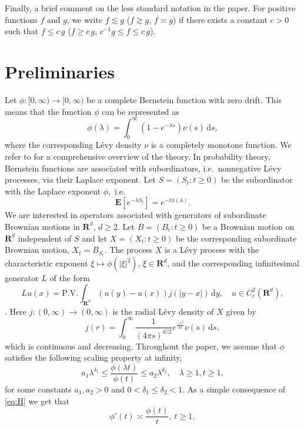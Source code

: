 \documentclass[a4paper,12pt,draft]{article}
\theoremstyle{plain}
\theoremstyle{definition}
\numberwithin{equation}{section}
\newcommand\R{\mathbf{R}}
\newcommand\E{\mathbf{E}}
\renewcommand{\le}{\leqslant}
\renewcommand{\leq}{\leqslant}
\renewcommand{\ge}{\geqslant}
\renewcommand{\geq}{\geqslant}
\newcommand{\1}{1}
\newcommand{\ds} {\, \mathrm{d}s}
\newcommand{\dy} {\, \mathrm{d}y}
\begin{document}
Finally, a brief comment on the less standard notation in the paper. For positive functions $f$ and $g$, we write $f\lesssim g$ ($f\gtrsim g$, $f\asymp g$) if there exists a constant $c>0$ such that $f\le c\, g$ ($f\ge c \,g$, $c^{-1} g\le f \le c\,g$).

\section{Preliminaries} \label{sec:prelim}
Let $\phi:[0,\infty)\to[0,\infty)$ be a complete Bernstein function with zero drift. This means that the function $\phi$ can be represented as
\[
\phi(\lambda)=\int_0^\infty \left(1-e^{-\lambda s}\right)\nu(s)\ds,
\]
where the corresponding L\' evy density $\nu$ is a completely monotone function. We refer to \cite{bernstein} for a comprehensive overview of the theory. In probability theory, Bernstein functions are associated with subordinators, i.e.~nonnegative L\' evy processes, via their Laplace exponent. Let $S=(S_t:t\ge0)$ be the subordinator with the Laplace exponent $\phi$,~i.e.
\[
\E[e^{-\lambda S_t}]=e^{-t\phi(\lambda)}.
\]
We are interested in operators associated with generators of subordinate Brownian motions in $\R^d$, $d\ge 2$. Let $B=(B_t:t\ge 0)$ be a Brownian motion on $\R^d$ independent of $S$ and let $X=(X_t:t\ge 0)$ be the corresponding subordinate Brownian motion, $X_t=B_{S_t}$. The process $X$ is a L\' evy process with the characteristic exponent $\xi\mapsto\phi(|\xi|^2)$, $\xi\in\R^d$, and the corresponding infinitesimal generator $L$ of the form
\begin{equation}\label{eq:L1}
Lu(x)=\text{P.V.}\int_{\R^d}(u(y)-u(x))j(|y-x|)\dy, \quad u\in C_c^2(\R^d),
\end{equation}
\cite[Theorem 31.5]{sato}. Here $j:(0,\infty)\to(0,\infty)$ is the radial L\' evy density of $X$ given by
\begin{equation}\label{eq:kernel}
j(r)=\int_0^\infty \frac{1}{(4\pi s)^{d/2}}e^{\frac{-r^2}{4s}}\nu(s)\ds,
\end{equation}
which is continuous and decreasing. Throughout the paper, we assume that $\phi$ satisfies the following scaling property at infinity,
\begin{equation}\label{eq:H}
   a_1\lambda^{\delta_1}\leq\frac{\phi(\lambda t)}{\phi(t)}\leq a_2\lambda^{\delta_2},\quad \lambda\geq 1, t\geq 1, 
\end{equation}
for some constants $a_1,a_2>0$ and $0<\delta_1\leq \delta_2<1$. As a simple consequence of \eqref{eq:H} we get that
 \begin{equation}\label{eq:phi1}
 \phi'(t)\asymp \frac{\phi(t)}{t},\ t\geq 1,
 \end{equation}
\end{document}
